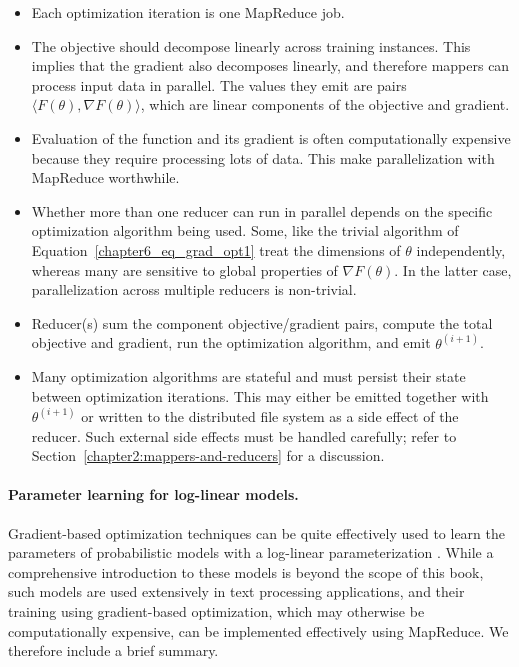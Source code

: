 \begin{itemize}

\item Each optimization iteration is one MapReduce job.

\item The objective should decompose linearly across training
  instances.  This implies that the gradient also decomposes linearly,
  and therefore mappers can process input data in parallel.  The
  values they emit are pairs $\langle F(\theta), \nabla F(\theta)
  \rangle$, which are linear components of the objective and gradient.

\item Evaluation of the function and its gradient is often
  computationally expensive because they require processing lots of
  data.  This make parallelization with MapReduce worthwhile.

\item Whether more than one reducer can run in parallel depends on the
  specific optimization algorithm being used.  Some, like the trivial
  algorithm of Equation~\ref{chapter6_eq_grad_opt1} treat the
  dimensions of $\theta$ independently, whereas many are sensitive to
  global properties of $\nabla F(\theta)$.  In the latter case,
  parallelization across multiple reducers is non-trivial.

\item Reducer(s) sum the component objective/gradient pairs, compute
  the total objective and gradient, run the optimization algorithm,
  and emit $\theta^{(i+1)}$.

\item Many optimization algorithms are stateful and must persist their
  state between optimization iterations.  This may either be emitted
  together with $\theta^{(i+1)}$ or written to the distributed file
  system as a side effect of the reducer. Such external side effects
  must be handled carefully; refer to
  Section~\ref{chapter2:mappers-and-reducers} for a discussion.

\end{itemize}


\paragraph{\textbf{Parameter learning for log-linear models.}}
Gradient-based optimization techniques can be quite effectively used
to learn the parameters of probabilistic models with a log-linear
parameterization \cite{Malouf_2002}.  While a comprehensive
introduction to these models is beyond the scope of this book, such
models are used extensively in text processing applications, and their
training using gradient-based optimization, which may otherwise be
computationally expensive, can be implemented effectively using
MapReduce. We therefore include a brief summary.

